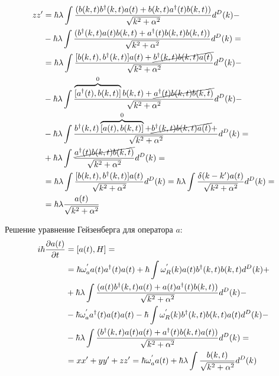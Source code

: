 \begin{equation}\notag
\begin{split}
    zz' & = \hbar \lambda \int \frac{(b(k,t) b^{\dagger}(k,t) a(t) + b(k,t) a^{\dagger}(t) b(k,t))}{\sqrt{k^{2} + \alpha^{2}}} d^{D}(k) - \\
    & - \hbar \lambda \int \frac{(b^{\dagger}(k,t) a(t) b(k,t) + a^{\dagger}(t) b(k,t) b(k,t))}{\sqrt{k^{2} + \alpha^{2}}} d^{D}(k) = \\
    & = \hbar \lambda \int \frac{[b(k,t), b^{\dagger}(k,t)] a(t) + \cancel{b^{\dagger}(k,t) b(k,t) a(t)}}{\sqrt{k^{2} + \alpha^{2}}} d^{D}(k) - \\
    & - \hbar \lambda \int \frac{\overbrace{[a^{\dagger}(t), b(k,t)]}^{0} b(k,t) + \cancel{a^{\dagger}(t) b(k,t) b(k,t)}}{\sqrt{k^{2} + \alpha^{2}}} d^{D}(k) - \\
    & - \hbar \lambda \int \frac{b^{\dagger}(k,t) \overbrace{[a(t), b(k,t)]}^{0} + \cancel{b^{\dagger}(k,t) b(k,t) a(t)} + }{\sqrt{k^{2} + \alpha^{2}}} d^{D}(k) = \\
    & + \hbar \lambda \int \frac{\cancel{a^{\dagger}(t) b(k,t) b(k,t)}}{\sqrt{k^{2} + \alpha^{2}}} d^{D}(k) = \\
    & = \hbar \lambda \int \frac{[b(k,t), b^{\dagger}(k,t)] a(t)}{\sqrt{k^{2} + \alpha^{2}}} d^{D}(k) = \hbar \lambda \int \frac{\delta (k-k') a(t)}{\sqrt{k^{2} + \alpha^{2}}} d^{D}(k) = \\
    & = \hbar \lambda \frac{a(t)}{\sqrt{k^{2} + \alpha^{2}}}
\end{split}
\end{equation}

Решение уравнение Гейзенберга для оператора $a$:
\begin{equation}\notag
\begin{split}
    i \hbar \frac{\partial a(t)}{\partial t} & = [a(t), H] = \\
    & = \hbar \omega^{'}_a a(t) a^{\dagger}(t) a(t) + \hbar \int \omega^{'}_{R}(k) a(t) b^{\dagger}(k,t) b(k,t) d^{D}(k) + \\
    & + \hbar \lambda \int \frac{(a(t) b^{\dagger}(k,t) a(t) + a(t) a^{\dagger}(t) b(k,t))}{\sqrt{k^{2} + \alpha^{2}}} d^{D}(k) - \\
    & - \hbar \omega^{'}_a a^{\dagger}(t) a(t) a(t) - \hbar \int \omega^{'}_{R}(k) b^{\dagger}(k,t) b(k,t) a(t) d^{D}(k) - \\
    & - \hbar \lambda \int \frac{(b^{\dagger}(k,t) a(t) a(t) + a^{\dagger}(t) b(k,t) a(t))}{\sqrt{k^{2} + \alpha^{2}}} d^{D}(k) = \\
    & = xx' + yy' + zz' = \hbar \omega^{'}_a a(t) + \hbar \lambda \int \frac{b(k,t)}{\sqrt{k^{2} + \alpha^{2}}} d^{D}(k)
\end{split}
\end{equation}


